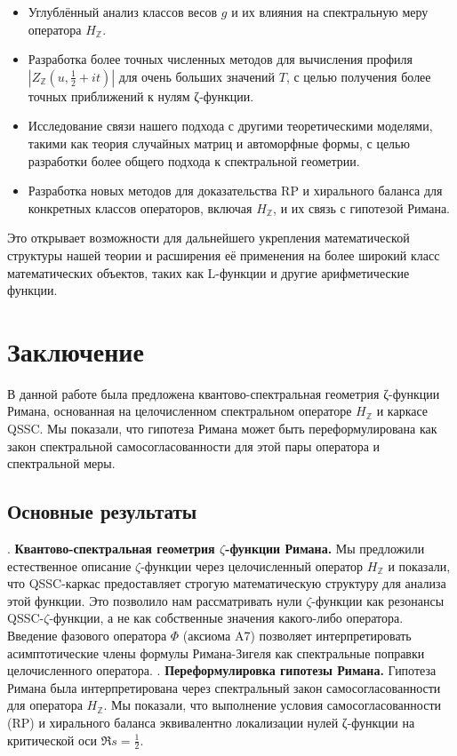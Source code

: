 \documentclass{article}
\numberwithin{equation}{section}
\theoremstyle{plain}
\theoremstyle{definition}
\theoremstyle{remark}
\begin{document}
\begin{itemize}
    \item Углублённый анализ классов весов \( g \) и их влияния на спектральную меру оператора \( H_{\mathbb{Z}} \).
    \item Разработка более точных численных методов для вычисления профиля \( |Z_{\mathbb{Z}}(u, \frac{1}{2} + it)| \) для очень больших значений \( T \), с целью получения более точных приближений к нулям ζ-функции.
    \item Исследование связи нашего подхода с другими теоретическими моделями, такими как теория случайных матриц и автоморфные формы, с целью разработки более общего подхода к спектральной геометрии.
    \item Разработка новых методов для доказательства RP и хирального баланса для конкретных классов операторов, включая \( H_{\mathbb{Z}} \), и их связь с гипотезой Римана.
\end{itemize}

\noindent
Это открывает возможности для дальнейшего укрепления математической структуры нашей теории и расширения её применения на более широкий класс математических объектов, таких как L-функции и другие арифметические функции.
\clearpage


\section{Заключение}
\label{sec:conclusion}

\noindent
В данной работе была предложена квантово-спектральная геометрия ζ-функции Римана, основанная на целочисленном спектральном операторе \( H_{\mathbb{Z}} \) и каркасе QSSC. Мы показали, что гипотеза Римана может быть переформулирована как закон спектральной самосогласованности для этой пары оператора и спектральной меры.

\subsection{Основные результаты}
. \textbf{Квантово-спектральная геометрия $\zeta$-функции Римана.} Мы предложили естественное описание $\zeta$-функции через целочисленный оператор \( H_{\mathbb{Z}} \) и показали, что QSSC-каркас предоставляет строгую математическую структуру для анализа этой функции.
Это позволило нам рассматривать нули $\zeta$-функции как резонансы QSSC-$\zeta$-функции, а не как собственные значения какого-либо оператора. Введение фазового оператора \(\Phi\) (аксиома A7) позволяет интерпретировать асимптотические члены формулы Римана-Зигеля как спектральные поправки целочисленного оператора.
. \textbf{Переформулировка гипотезы Римана.} Гипотеза Римана была интерпретирована через спектральный закон самосогласованности для оператора \( H_{\mathbb{Z}} \). Мы показали, что выполнение условия самосогласованности (RP) и хирального баланса эквивалентно локализации нулей ζ-функции на критической оси \( \Re s = \frac{1}{2} \).
\end{document}
